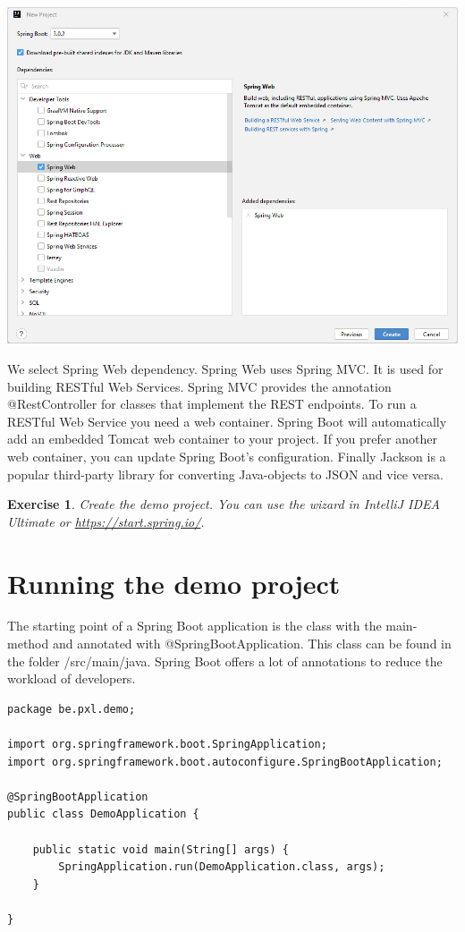 \documentclass[a4paper, 12pt]{report}
\newenvironment{boxexercise}
{\begin{tcolorbox}
[enhanced jigsaw,breakable,pad at break*=1mm,
 colback=tsyellow!20,boxrule=0pt,frame hidden]}
{\end{tcolorbox}}
\newtheorem{envoefening}{\textbf{Exercise}}[chapter]
\newenvironment{oefening}
               {\begin{boxexercise}\begin{envoefening}}
               {\end{envoefening}\end{boxexercise}}
\begin{document}
\includegraphics[width=\textwidth]{./images/chapter1/new_project.png}

We select Spring Web dependency. Spring Web uses Spring MVC. It is used for building RESTful Web Services. Spring MVC provides the annotation @RestController for classes that implement the REST endpoints.
To run a RESTful Web Service you need a web container. Spring Boot will automatically add an embedded Tomcat web container to your project. If you prefer another web container, you can update Spring Boot's configuration.
Finally Jackson is a popular third-party library for converting Java-objects to JSON and vice versa.

\begin{oefening}
Create the demo project. You can use the wizard in IntelliJ IDEA Ultimate or \url{https://start.spring.io/}.
\end{oefening}

\section{Running the demo project}

The starting point of a Spring Boot application is the class with the main-method and annotated with @SpringBootApplication.  This class can be found in the folder /src/main/java.  Spring Boot offers a lot of annotations to reduce the workload of developers.   

\begin{lstlisting}[frame=single]
package be.pxl.demo;

import org.springframework.boot.SpringApplication;
import org.springframework.boot.autoconfigure.SpringBootApplication;

@SpringBootApplication
public class DemoApplication {

    public static void main(String[] args) {
        SpringApplication.run(DemoApplication.class, args);
    }

}
\end{lstlisting}
\end{document}
